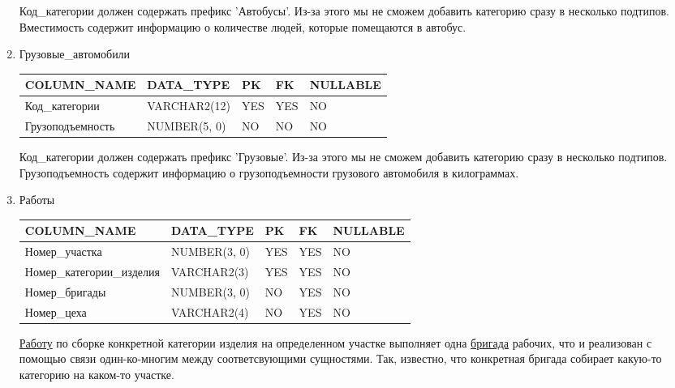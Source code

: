 \begin{enumerate}
\begin{tabular}{|p{7cm}|p{3cm}|p{1cm}|p{1cm}|p{3cm}|}
    \end{tabular}

    Код\_категории должен содержать префикс 'Автобусы'. Из-за этого мы не сможем добавить категорию сразу в несколько подтипов.
    Вместимость содержит информацию о количестве людей, которые помещаются в автобус.

    \item{Грузовые\_автомобили}

    \begin{tabular}{|p{7cm}|p{3cm}|p{1cm}|p{1cm}|p{3cm}|} \hline

        {\bf COLUMN\_NAME} & {\bf DATA\_TYPE} & {\bf PK} & {\bf FK} & {\bf NULLABLE} \\ \hline
        Код\_категории & VARCHAR2(12) & YES & YES & NO \\ \hline
        Грузоподъемность & NUMBER(5, 0) & NO & NO & NO \\ \hline

    \end{tabular}

    Код\_категории должен содержать префикс 'Грузовые'. Из-за этого мы не сможем добавить категорию сразу в несколько подтипов.
    Грузоподъемность содержит информацию о грузоподъемности грузового автомобиля в килограммах.

    \item{Работы}

    \begin{tabular}{|p{7cm}|p{3cm}|p{1cm}|p{1cm}|p{3cm}|} \hline

        {\bf COLUMN\_NAME} & {\bf DATA\_TYPE} & {\bf PK} & {\bf FK} & {\bf NULLABLE} \\ \hline
        Номер\_участка & NUMBER(3, 0) & YES & YES & NO \\ \hline
        Номер\_категории\_изделия & VARCHAR2(3) & YES & YES & NO \\ \hline
        Номер\_бригады & NUMBER(3, 0) & NO & YES & NO \\ \hline
        Номер\_цеха & VARCHAR2(4) & NO & YES & NO \\ \hline

    \end{tabular}

    \underline{Работу} по сборке конкретной категории изделия на определенном участке выполняет одна \underline{бригада} рабочих, что и реализован с помощью связи один-ко-многим между соответсвующими сущностями.
    Так, известно, что конкретная бригада собирает какую-то категорию на каком-то участке.


\end{enumerate}

